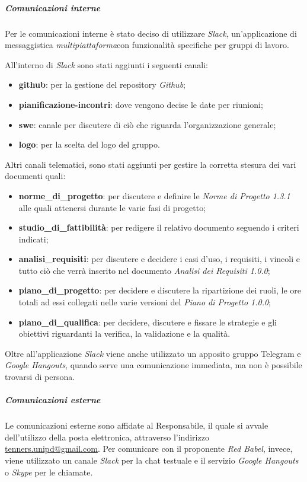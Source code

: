    		\subparagraph*{Comunicazioni interne}
   		Per le comunicazioni interne è stato deciso di utilizzare \textit{ Slack\glos}, un'applicazione di messaggistica \textit{multipiattaforma}\glo con funzionalità specifiche per gruppi di lavoro. 
   		
   		\noindent All'interno di \textit{Slack\glo} sono stati aggiunti i seguenti canali:
   		\begin{itemize}
   			\item \textbf{github}: per la gestione del repository \textit{Github\glos};
   			\item \textbf{pianificazione-incontri}: dove vengono decise le date per riunioni;
   			\item \textbf{swe}: canale per discutere di ciò che riguarda l'organizzazione generale;
   			\item \textbf{logo}: per la scelta del logo del gruppo.
   			
   		\end{itemize}
   		Altri canali telematici, sono stati aggiunti per gestire la corretta stesura dei vari documenti quali:
   		\begin{itemize}
   			\item \textbf{norme\_di\_progetto}: per discutere e definire le \textit{Norme di Progetto 1.3.1\doc} alle quali attenersi durante le varie fasi di progetto;
   			\item \textbf{studio\_di\_fattibilità}: per redigere il relativo documento seguendo i criteri indicati;
   			\item \textbf{analisi\_requisiti}: per discutere e decidere i casi d'uso, i requisiti, i vincoli e tutto ciò che verrà inserito nel documento \textit{Analisi dei Requisiti 1.0.0\docs};
   			\item \textbf{piano\_di\_progetto}: per decidere e discutere la ripartizione dei ruoli, le ore totali ad essi collegati nelle varie versioni del \textit{Piano di Progetto 1.0.0\docs};
   			\item \textbf{piano\_di\_qualifica}: per decidere, discutere e fissare le strategie e gli obiettivi riguardanti la verifica, la validazione e la qualità.
   		\end{itemize}
   		Oltre all'applicazione \textit{Slack\glo} viene anche utilizzato un apposito gruppo Telegram e \textit{Google Hangouts\glo}, quando serve una comunicazione immediata, ma non è possibile trovarsi di persona.
   		
   		\subparagraph*{Comunicazioni esterne}
   		Le comunicazioni esterne sono affidate al Responsabile, il quale si avvale dell'utilizzo della posta elettronica, attraverso l'indirizzo \href{mailto:tenners.unipd@gmail.com}{tenners.unipd@gmail.com}.
   		Per comunicare con il proponente \textit{Red Babel}, invece, viene utilizzato un canale \textit{Slack\glo} per la chat testuale e il servizio \textit{Google Hangouts\glos} o \textit{Skype\glo} per le chiamate. 
   		
